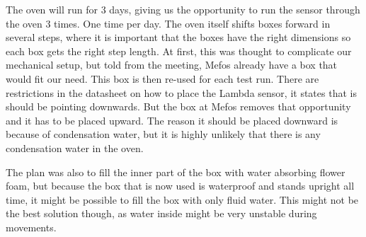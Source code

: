 The oven will run for 3 days, giving us the opportunity to run the sensor through the oven 3 times. One time per day. The oven itself shifts boxes forward in several steps, where it is important that the boxes have the right dimensions so each box gets the right step length. At first, this was thought to complicate our mechanical setup, but told from the meeting, Mefos already have a box that would fit our need. This box is then re-used for each test run. There are restrictions in the datasheet on how to place the Lambda sensor, it states that is should be pointing downwards. But the box at Mefos removes that opportunity and it has to be placed upward. The reason it should be placed downward is because of condensation water, but it is highly unlikely that there is any condensation water in the oven.


The plan was also to fill the inner part of the box with water absorbing flower foam, but because the box that is now used is waterproof and stands upright all time, it might be possible to fill the box with only fluid water. This might not be the best solution though, as water inside might be very unstable during movements.


